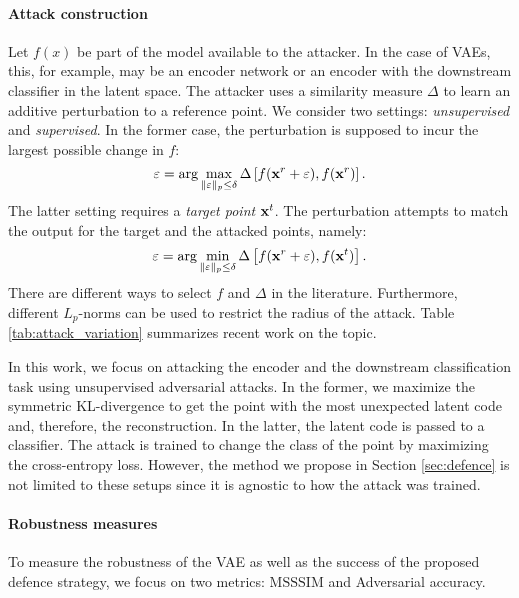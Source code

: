 \paragraph{Attack construction} 
Let $f(x)$ be part of the model available to the attacker. In the case of VAEs, this, for example, may be an encoder network or an encoder with the downstream classifier in the latent space. The attacker uses a similarity measure $\Delta$ to learn an additive perturbation to a reference point. We consider two settings: \textit{unsupervised} and \textit{supervised}. In the former case, the perturbation is supposed to incur the largest possible change in $f$:
\begin{equation}\label{eq:objective_unsup}
    \varepsilon = \arg\max_{\|\varepsilon\|_p \leq \delta }\Delta\left[f(\rvx^r + \varepsilon) , f(\rvx^r) \right].
\end{equation}
The latter setting requires a \textit{target point} ${\mathbf{x}}^t$. The perturbation attempts to match the output for the target and the attacked points, namely:
\begin{equation}\label{eq:objective_sup}
    \varepsilon = \arg\min_{\|\varepsilon\|_p \leq \delta }\Delta\left[ f(\rvx^r + \varepsilon), f(\rvx^t) \right].
\end{equation}
There are different ways to select $f$ and $\Delta$ in the literature. Furthermore, different $L_p$-norms can be used to restrict the radius of the attack. Table \ref{tab:attack_variation} summarizes recent work on the topic. %

In this work, we focus on attacking the encoder and the downstream classification task using unsupervised adversarial attacks. 
In the former, we maximize the symmetric KL-divergence to get the point with the most unexpected latent code and, therefore, the reconstruction. In the latter, the latent code is passed to a classifier. The attack is trained to change the class of the point by maximizing the cross-entropy loss. However, the method we propose in Section \ref{sec:defence} is not limited to these setups since it is agnostic to how the attack was trained. 

\paragraph{Robustness measures} 
To measure the robustness of the VAE as well as the success of the proposed defence strategy, we focus on two metrics: $\mathrm{MSSSIM}$ and Adversarial accuracy.

